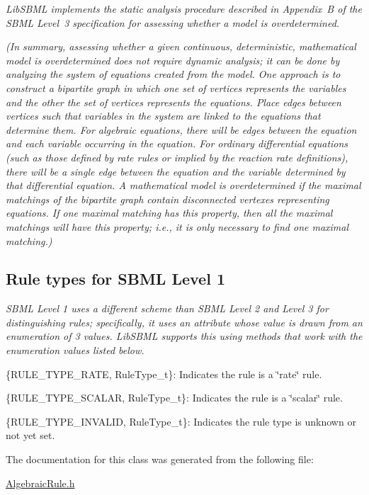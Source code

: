 {\itshape  Lib\+S\+B\+ML implements the static analysis procedure described in Appendix~B of the S\+B\+ML Level~3 specification for assessing whether a model is overdetermined.}

{\itshape  (In summary, assessing whether a given continuous, deterministic, mathematical model is overdetermined does not require dynamic analysis; it can be done by analyzing the system of equations created from the model. One approach is to construct a bipartite graph in which one set of vertices represents the variables and the other the set of vertices represents the equations. Place edges between vertices such that variables in the system are linked to the equations that determine them. For algebraic equations, there will be edges between the equation and each variable occurring in the equation. For ordinary differential equations (such as those defined by rate rules or implied by the reaction rate definitions), there will be a single edge between the equation and the variable determined by that differential equation. A mathematical model is overdetermined if the maximal matchings of the bipartite graph contain disconnected vertexes representing equations. If one maximal matching has this property, then all the maximal matchings will have this property; i.\+e., it is only necessary to find one maximal matching.)}

{\itshape }\hypertarget{classdoc__rules__general__summary_RuleType_t}{}\subsection{Rule types for S\+B\+M\+L Level 1}\label{classdoc__rules__general__summary_RuleType_t}
{\itshape  S\+B\+ML Level 1 uses a different scheme than S\+B\+ML Level 2 and Level 3 for distinguishing rules; specifically, it uses an attribute whose value is drawn from an enumeration of 3 values. Lib\+S\+B\+ML supports this using methods that work with the enumeration values listed below.}

{\itshape  \begin{DoxyItemize}
\item \{R\+U\+L\+E\+\_\+\+T\+Y\+P\+E\+\_\+\+R\+A\+TE, Rule\+Type\+\_\+t\}\+: Indicates the rule is a \char`\"{}rate\char`\"{} rule. \item \{R\+U\+L\+E\+\_\+\+T\+Y\+P\+E\+\_\+\+S\+C\+A\+L\+AR, Rule\+Type\+\_\+t\}\+: Indicates the rule is a \char`\"{}scalar\char`\"{} rule. \item \{R\+U\+L\+E\+\_\+\+T\+Y\+P\+E\+\_\+\+I\+N\+V\+A\+L\+ID, Rule\+Type\+\_\+t\}\+: Indicates the rule type is unknown or not yet set. \end{DoxyItemize}
}

The documentation for this class was generated from the following file\+:\begin{DoxyCompactItemize}
\item 
\hyperlink{_algebraic_rule_8h}{Algebraic\+Rule.\+h}\end{DoxyCompactItemize}
